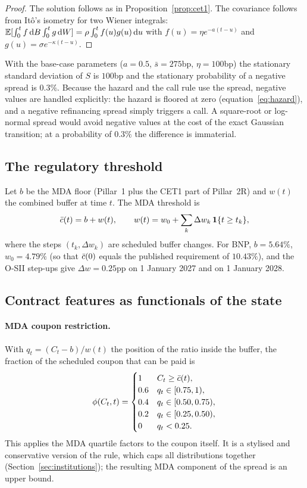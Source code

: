 \begin{proof}
The solution follows as in Proposition~\ref{prop:cet1}. The covariance follows from
It\^o's isometry for two Wiener integrals:
$\mathbb{E}[\int_0^tf\,\mathrm{d} B\int_0^tg\,\mathrm{d} W]=\rho\int_0^tf(u)g(u)\,\mathrm{d} u$ with
$f(u)=\eta e^{-a(t-u)}$ and $g(u)=\sigma e^{-\kappa(t-u)}$.
\end{proof}

With the base-case parameters ($a=0.5$, $\bar s=275$bp, $\eta=100$bp) the stationary
standard deviation of $S$ is $100$bp and the stationary probability of a negative spread
is $0.3\%$. Because the hazard and the call rule use the spread, negative values are
handled explicitly: the hazard is floored at zero (equation~\eqref{eq:hazard}), and a
negative refinancing spread simply triggers a call. A square-root or log-normal spread
would avoid negative values at the cost of the exact Gaussian transition; at a
probability of $0.3\%$ the difference is immaterial.

\subsection{The regulatory threshold}

Let $b$ be the MDA floor (Pillar~1 plus the CET1 part of Pillar~2R) and $w(t)$ the
combined buffer at time $t$. The MDA threshold is
\begin{equation}\label{eq:mdathreshold}
  \bar c(t) = b + w(t),\qquad w(t)=w_0+\sum_k \Delta w_k\,\mathbf{1}\{t\ge t_k\},
\end{equation}
where the steps $(t_k,\Delta w_k)$ are scheduled buffer changes. For BNP, $b=5.64\%$,
$w_0=4.79\%$ (so that $\bar c(0)$ equals the published requirement of $10.43\%$), and the
O-SII step-ups give $\Delta w=0.25$pp on 1 January 2027 and on 1 January 2028.

\subsection{Contract features as functionals of the state}

\paragraph{MDA coupon restriction.} With $q_t=(C_t-b)/w(t)$ the position of the ratio
inside the buffer, the fraction of the scheduled coupon that can be paid is
\begin{equation}\label{eq:mda}
  \phi(C_t,t)=
  \begin{cases}
    1 & C_t\ge \bar c(t),\\
    0.6 & q_t\in[0.75,1),\\
    0.4 & q_t\in[0.50,0.75),\\
    0.2 & q_t\in[0.25,0.50),\\
    0 & q_t<0.25.
  \end{cases}
\end{equation}
This applies the MDA quartile factors to the coupon itself. It is a stylised and
conservative version of the rule, which caps all distributions together
(Section~\ref{sec:institutions}); the resulting MDA component of the spread is an upper
bound.

